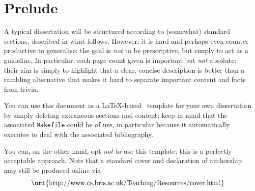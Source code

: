 \documentclass[ %
                    author={Callum Pearce},
                supervisor={Dr. Neill Campbell},
                    degree={MEng},
                     title={How effective are Temporal difference learning methods for reducing the number of zero contribution light paths, while still accurately approximating Global Illumination in Path tracing?},
                  subtitle={},
                      type={research},
                      year={2019} ]{dissertation}
\begin{document}


\section*{Prelude}
\thispagestyle{empty}

A typical dissertation will be structured according to (somewhat) standard 
sections, described in what follows.  However, it is hard and perhaps even 
counter-productive to generalise: the goal is {\em not} to be prescriptive, 
but simply to act as a guideline.  In particular, each page count given is
important but {\em not} absolute: their aim is simply to highlight that a 
clear, concise description is better than a rambling alternative that makes
it hard to separate important content and facts from trivia.

You can use this document as a \LaTeX-based~\cite{latexbook1,latexbook2} 
template for your own dissertation by simply deleting extraneous sections
and content; keep in mind that the associated {\tt Makefile} could be of
use, in particular because it automatically executes  to 
deal with the associated bibliography.  

You can, on the other hand, opt {\em not} to use this template; this is a 
perfectly acceptable approach.  Note that a standard cover and declaration 
of authorship may still be produced online via
\[
\mbox{\url{http://www.cs.bris.ac.uk/Teaching/Resources/cover.html}}
\]



\maketitle

\end{document}
